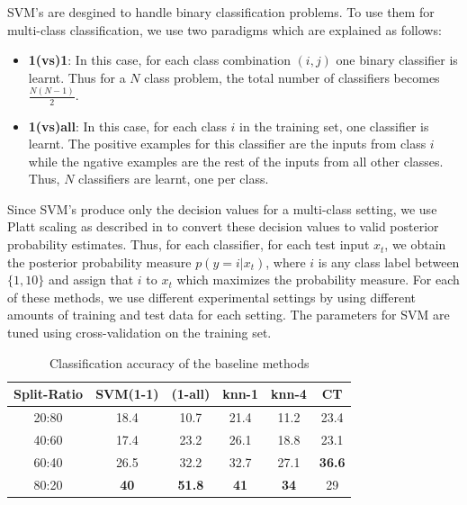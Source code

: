 \documentclass[10pt,twocolumn,letterpaper]{article}
\begin{document}
SVM's are desgined to handle binary classification problems. To use them for multi-class classification, we use two paradigms which are explained as follows:
\begin{itemize}
\item \textbf{1(vs)1}: In this case, for each class combination $(i,j)$ one binary classifier is learnt. Thus for a $N$ class problem, the total number of classifiers becomes $\frac{N(N-1)}{2}$. 

\item \textbf{1(vs)all}: In this case, for each class $i$ in the training set, one classifier is learnt. The positive examples for this classifier are the inputs from class $i$ while the ngative examples are the rest of the inputs from all other classes. Thus, $N$ classifiers are learnt, one per class. 
\end{itemize}

Since SVM's produce only the decision values for a multi-class setting, we use Platt scaling as described in \cite{Platt1999} to convert these decision values to valid posterior probability estimates. Thus, for each classifier, for each test input $x_t$, we obtain the posterior probability measure $p(y=i|x_t)$, where $i$ is any class label between $\{1,10\}$ and assign that $i$ to $x_t$ which maximizes the probability measure. For each of these methods, we use different experimental settings by using different amounts of training and test data for each setting. The parameters for SVM are tuned using cross-validation on the training set. 

\begin{table}[ht] 
\caption{Classification accuracy of the baseline methods} %
\centering %
\begin{tabular}{c c c c c c} %
\hline\hline %
Split-Ratio  & SVM(1-1) & (1-all) & knn-1 & knn-4 & CT\\ [0.5ex] %
\hline %
20:80 &	18.4	 & 10.7  & 21.4 & 11.2 & 23.4 \\
40:60 &	17.4 &	23.2 & 26.1	& 18.8 &	 23.1 \\
60:40 &	26.5	 & 32.2	 & 32.7	& 27.1 &	 \textbf{36.6} \\
80:20 &	\textbf{40}   &	\textbf{51.8}	 & \textbf{41}	& \textbf{34}	   & 29 \\  [1ex]
\hline %
\end{tabular} 
\label{table:acc} %
\end{table} 
\end{document}
